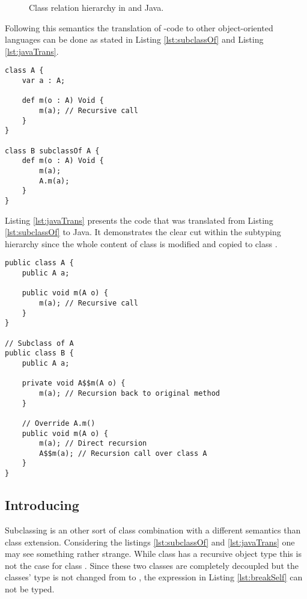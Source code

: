 \begin{figure}
	\centering
	\caption{Class relation hierarchy in \ooplss and Java.}
	\label{fig:inheritHierarchy}
\end{figure}

Following this semantics the translation of \ooplss-code to
other object-oriented languages can be done as stated in Listing
\ref{lst:subclassOf} and Listing \ref{lst:javaTrans}.

\begin{lstlisting}[float=ht,language=ooplss,caption=Subclassing in \ooplss.,label=lst:subclassOf]
class A {
	var a : A;

	def m(o : A) Void {
		m(a); // Recursive call
	}
}

class B subclassOf A {
	def m(o : A) Void {
		m(a);
		A.m(a);
	}
}
\end{lstlisting}

Listing \ref{lst:javaTrans} presents the code that was translated from Listing
\ref{lst:subclassOf} to Java. It demonstrates the clear cut within
the subtyping hierarchy since the whole content of class \A is modified
and copied to class \B.

\begin{lstlisting}[float=ht,caption=Subclassing translated to Java.,label=lst:javaTrans]
public class A {
	public A a;

	public void m(A o) {
		m(a); // Recursive call
	}
}

// Subclass of A
public class B {
	public A a;

	private void A$$m(A o) {
		m(a); // Recursion back to original method
	}

	// Override A.m()
	public void m(A o) {
		m(a); // Direct recursion
		A$$m(a); // Recursion call over class A
	}
}
\end{lstlisting}


\subsection{Introducing \mytype}
Subclassing is an other sort of class combination with a
different semantics than class extension. Considering the listings
\ref{lst:subclassOf} and \ref{lst:javaTrans} one may see something rather
strange. While class \A has a recursive object type this is not the case
for class \B. Since these two classes are completely decoupled but the
classes' type is not changed from \A to \B, the expression in Listing
\ref{lst:breakSelf} can not be typed.

